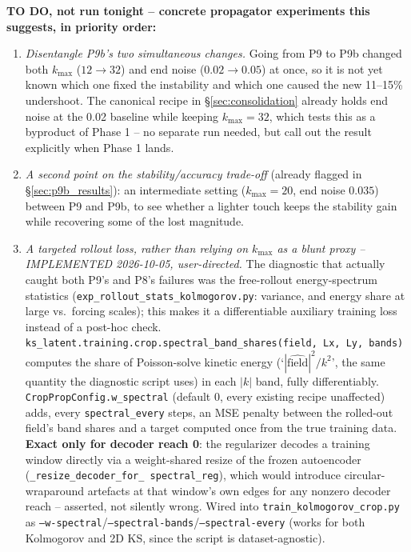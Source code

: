 \documentclass[11pt]{article}
\begin{document}
\textbf{TO DO, not run tonight -- concrete propagator experiments this
suggests, in priority order:}
\begin{enumerate}[leftmargin=*]
\item \emph{Disentangle P9b's two simultaneous changes.} Going from P9
  to P9b changed both $k_{\max}$ ($12\to32$) and end noise
  ($0.02\to0.05$) at once, so it is not yet known which one fixed the
  instability and which one caused the new 11--15\% undershoot. The
  canonical recipe in \S\ref{sec:consolidation} already holds end noise
  at the 0.02 baseline while keeping $k_{\max}{=}32$, which tests this
  as a byproduct of Phase 1 -- no separate run needed, but call out the
  result explicitly when Phase 1 lands.
\item \emph{A second point on the stability/accuracy trade-off}
  (already flagged in \S\ref{sec:p9b_results}): an intermediate setting
  ($k_{\max}{=}20$, end noise $0.035$) between P9 and P9b, to see
  whether a lighter touch keeps the stability gain while recovering
  some of the lost magnitude.
\item \emph{A targeted rollout loss, rather than relying on
  $k_{\max}$ as a blunt proxy -- IMPLEMENTED 2026-10-05, user-directed.}
  The diagnostic that actually caught both P9's and P8's failures was
  the free-rollout energy-spectrum statistics
  (\texttt{exp\_rollout\_stats\_kolmogorov.py}: variance, and energy
  share at large vs.\ forcing scales); this makes it a differentiable
  auxiliary training loss instead of a post-hoc check.
  \texttt{ks\_latent.training.crop.spectral\_band\_shares(field, Lx, Ly,
  bands)} computes the share of Poisson-solve kinetic energy
  (`$|\widehat{\mathrm{field}}|^2/k^2$', the same quantity the
  diagnostic script uses) in each $|k|$ band, fully differentiably.
  \texttt{CropPropConfig.w\_spectral} (default 0, every existing recipe
  unaffected) adds, every \texttt{spectral\_every} steps, an MSE penalty
  between the rolled-out field's band shares and a target computed once
  from the true training data. \textbf{Exact only for decoder reach 0}:
  the regularizer decodes a training window directly via a weight-shared
  resize of the frozen autoencoder (\texttt{\_resize\_decoder\_for\_\allowbreak
  spectral\_reg}), which would introduce circular-wraparound artefacts at
  that window's own edges for any nonzero decoder reach -- asserted, not
  silently wrong. Wired into \texttt{train\_kolmogorov\_crop.py} as
  \texttt{--w-spectral}/\texttt{--spectral-bands}/\texttt{--spectral-every}
  (works for both Kolmogorov and 2D KS, since the script is dataset-agnostic).

\end{enumerate}
\end{document}

